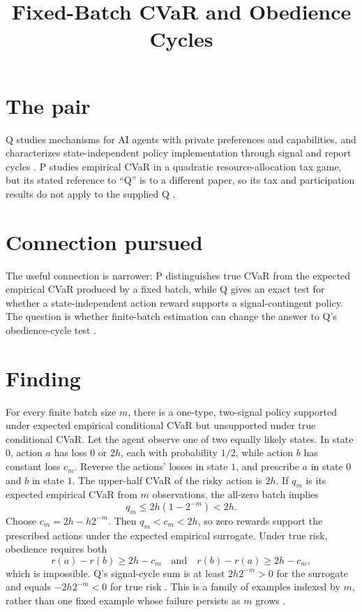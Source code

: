 \documentclass{article}
\title{Fixed-Batch CVaR and Obedience Cycles}
\begin{document}
\maketitle

\section{The pair}

Q studies mechanisms for AI agents with private preferences and capabilities, and characterizes state-independent policy implementation through signal and report cycles . P studies empirical CVaR in a quadratic resource-allocation tax game, but its stated reference to ``Q'' is to a different paper, so its tax and participation results do not apply to the supplied Q .

\section{Connection pursued}

The useful connection is narrower: P distinguishes true CVaR from the expected empirical CVaR produced by a fixed batch, while Q gives an exact test for whether a state-independent action reward supports a signal-contingent policy. The question is whether finite-batch estimation can change the answer to Q's obedience-cycle test .

\section{Finding}

For every finite batch size \(m\), there is a one-type, two-signal policy supported under expected empirical conditional CVaR but unsupported under true conditional CVaR. Let the agent observe one of two equally likely states. In state \(0\), action \(a\) has loss \(0\) or \(2h\), each with probability \(1/2\), while action \(b\) has constant loss \(c_m\). Reverse the actions' losses in state \(1\), and prescribe \(a\) in state \(0\) and \(b\) in state \(1\). The upper-half CVaR of the risky action is \(2h\). If \(q_m\) is its expected empirical CVaR from \(m\) observations, the all-zero batch implies
\[
q_m\leq 2h(1-2^{-m})<2h.
\]
Choose \(c_m=2h-h2^{-m}\). Then \(q_m<c_m<2h\), so zero rewards support the prescribed actions under the expected empirical surrogate. Under true risk, obedience requires both
\[
r(a)-r(b)\geq 2h-c_m
\quad\text{and}\quad
r(b)-r(a)\geq 2h-c_m,
\]
which is impossible. Q's signal-cycle sum is at least \(2h2^{-m}>0\) for the surrogate and equals \(-2h2^{-m}<0\) for true risk . This is a family of examples indexed by \(m\), rather than one fixed example whose failure persists as \(m\) grows .
\end{document}
